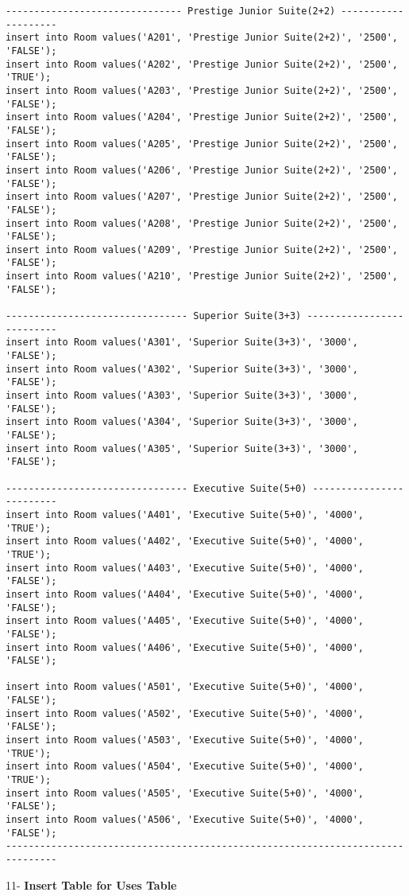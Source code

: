 \documentclass[a4,12pt]{report}
\begin{document}
\begin{lstlisting}
------------------------------- Prestige Junior Suite(2+2) --------------------
insert into Room values('A201', 'Prestige Junior Suite(2+2)', '2500', 'FALSE');
insert into Room values('A202', 'Prestige Junior Suite(2+2)', '2500', 'TRUE');
insert into Room values('A203', 'Prestige Junior Suite(2+2)', '2500', 'FALSE');
insert into Room values('A204', 'Prestige Junior Suite(2+2)', '2500', 'FALSE');
insert into Room values('A205', 'Prestige Junior Suite(2+2)', '2500', 'FALSE');
insert into Room values('A206', 'Prestige Junior Suite(2+2)', '2500', 'FALSE');
insert into Room values('A207', 'Prestige Junior Suite(2+2)', '2500', 'FALSE');
insert into Room values('A208', 'Prestige Junior Suite(2+2)', '2500', 'FALSE');
insert into Room values('A209', 'Prestige Junior Suite(2+2)', '2500', 'FALSE');
insert into Room values('A210', 'Prestige Junior Suite(2+2)', '2500', 'FALSE');

-------------------------------- Superior Suite(3+3) --------------------------
insert into Room values('A301', 'Superior Suite(3+3)', '3000', 'FALSE');
insert into Room values('A302', 'Superior Suite(3+3)', '3000', 'FALSE');
insert into Room values('A303', 'Superior Suite(3+3)', '3000', 'FALSE');
insert into Room values('A304', 'Superior Suite(3+3)', '3000', 'FALSE');
insert into Room values('A305', 'Superior Suite(3+3)', '3000', 'FALSE');

-------------------------------- Executive Suite(5+0) -------------------------
insert into Room values('A401', 'Executive Suite(5+0)', '4000', 'TRUE');
insert into Room values('A402', 'Executive Suite(5+0)', '4000', 'TRUE');
insert into Room values('A403', 'Executive Suite(5+0)', '4000', 'FALSE');
insert into Room values('A404', 'Executive Suite(5+0)', '4000', 'FALSE');
insert into Room values('A405', 'Executive Suite(5+0)', '4000', 'FALSE');
insert into Room values('A406', 'Executive Suite(5+0)', '4000', 'FALSE');

insert into Room values('A501', 'Executive Suite(5+0)', '4000', 'FALSE');
insert into Room values('A502', 'Executive Suite(5+0)', '4000', 'FALSE');
insert into Room values('A503', 'Executive Suite(5+0)', '4000', 'TRUE');
insert into Room values('A504', 'Executive Suite(5+0)', '4000', 'TRUE');
insert into Room values('A505', 'Executive Suite(5+0)', '4000', 'FALSE');
insert into Room values('A506', 'Executive Suite(5+0)', '4000', 'FALSE');
-------------------------------------------------------------------------------
\end{lstlisting}

\begin{flushleft}
11- \textbf{ Insert Table for Uses Table}
\end{flushleft}
\end{document}
